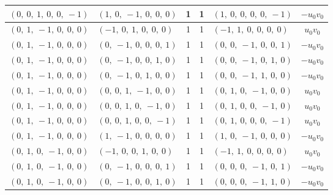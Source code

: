 \documentclass[11pt]{article}
\theoremstyle{definition}
\begin{document}
\begin{longtable}{|l|l|c|c|l|c|}
    \hline
    $\left( 0, \  0, \  1, \  0, \  0, \  -1\right)$ & $\left( 1, \  0, \  -1, \  0, \  0, \  0\right)$ & 1 & 1 & $\left( 1, \  0, \  0, \  0, \  0, \  -1\right)$ & $- u_{0} v_{0}$ \\
    \hline
    $\left( 0, \  1, \  -1, \  0, \  0, \  0\right)$ & $\left( -1, \  0, \  1, \  0, \  0, \  0\right)$ & 1 & 1 & $\left( -1, \  1, \  0, \  0, \  0, \  0\right)$ & $u_{0} v_{0}$ \\
    \hline
    $\left( 0, \  1, \  -1, \  0, \  0, \  0\right)$ & $\left( 0, \  -1, \  0, \  0, \  0, \  1\right)$ & 1 & 1 & $\left( 0, \  0, \  -1, \  0, \  0, \  1\right)$ & $- u_{0} v_{0}$ \\
    \hline
    $\left( 0, \  1, \  -1, \  0, \  0, \  0\right)$ & $\left( 0, \  -1, \  0, \  0, \  1, \  0\right)$ & 1 & 1 & $\left( 0, \  0, \  -1, \  0, \  1, \  0\right)$ & $- u_{0} v_{0}$ \\
    \hline
    $\left( 0, \  1, \  -1, \  0, \  0, \  0\right)$ & $\left( 0, \  -1, \  0, \  1, \  0, \  0\right)$ & 1 & 1 & $\left( 0, \  0, \  -1, \  1, \  0, \  0\right)$ & $- u_{0} v_{0}$ \\
    \hline
    $\left( 0, \  1, \  -1, \  0, \  0, \  0\right)$ & $\left( 0, \  0, \  1, \  -1, \  0, \  0\right)$ & 1 & 1 & $\left( 0, \  1, \  0, \  -1, \  0, \  0\right)$ & $u_{0} v_{0}$ \\
    \hline
    $\left( 0, \  1, \  -1, \  0, \  0, \  0\right)$ & $\left( 0, \  0, \  1, \  0, \  -1, \  0\right)$ & 1 & 1 & $\left( 0, \  1, \  0, \  0, \  -1, \  0\right)$ & $u_{0} v_{0}$ \\
    \hline
    $\left( 0, \  1, \  -1, \  0, \  0, \  0\right)$ & $\left( 0, \  0, \  1, \  0, \  0, \  -1\right)$ & 1 & 1 & $\left( 0, \  1, \  0, \  0, \  0, \  -1\right)$ & $u_{0} v_{0}$ \\
    \hline
    $\left( 0, \  1, \  -1, \  0, \  0, \  0\right)$ & $\left( 1, \  -1, \  0, \  0, \  0, \  0\right)$ & 1 & 1 & $\left( 1, \  0, \  -1, \  0, \  0, \  0\right)$ & $- u_{0} v_{0}$ \\
    \hline
    $\left( 0, \  1, \  0, \  -1, \  0, \  0\right)$ & $\left( -1, \  0, \  0, \  1, \  0, \  0\right)$ & 1 & 1 & $\left( -1, \  1, \  0, \  0, \  0, \  0\right)$ & $u_{0} v_{0}$ \\
    \hline
    $\left( 0, \  1, \  0, \  -1, \  0, \  0\right)$ & $\left( 0, \  -1, \  0, \  0, \  0, \  1\right)$ & 1 & 1 & $\left( 0, \  0, \  0, \  -1, \  0, \  1\right)$ & $- u_{0} v_{0}$ \\
    \hline
    $\left( 0, \  1, \  0, \  -1, \  0, \  0\right)$ & $\left( 0, \  -1, \  0, \  0, \  1, \  0\right)$ & 1 & 1 & $\left( 0, \  0, \  0, \  -1, \  1, \  0\right)$ & $- u_{0} v_{0}$ \\

\end{longtable}
\end{document}
